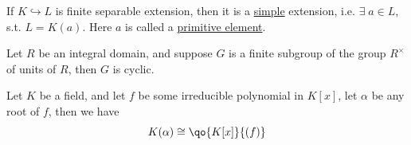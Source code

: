 \begin{theorem}
	\label{thm:primitive-element-theorem}
	If \( K \hookrightarrow L \) is finite separable extension, then it is a \underline{simple}
	extension, i.e. \( \exists \; a \in L \), s.t. \( L = K(a) \). Here \( a \) is called a
	\underline{primitive element}.
\end{theorem}

\begin{lemma}
	Let \( R \) be an integral domain, and suppose \( G \) is a finite subgroup of the group \( R^\times \) of units of \( R \),
	then \( G \) is cyclic.
\end{lemma}

\begin{lemma}
	Let \( K \) be a field, and let \( f \) be some irreducible polynomial in \( K[x] \), let \( \alpha \) be any root of \( f \), then we have
	\[
		K(\alpha) \cong \qo{K[x]}{(f)}
	\]
\end{lemma}

